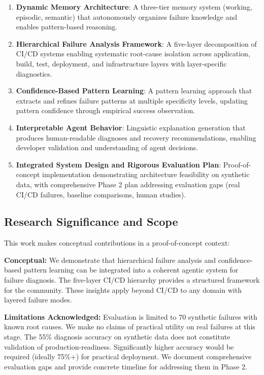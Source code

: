 \documentclass[11pt]{article}
\begin{document}
\begin{enumerate}
    \item \textbf{Dynamic Memory Architecture}: A three-tier memory system (working, episodic, semantic) that autonomously organizes failure knowledge and enables pattern-based reasoning.

    \item \textbf{Hierarchical Failure Analysis Framework}: A five-layer decomposition of CI/CD systems enabling systematic root-cause isolation across application, build, test, deployment, and infrastructure layers with layer-specific diagnostics.

    \item \textbf{Confidence-Based Pattern Learning}: A pattern learning approach that extracts and refines failure patterns at multiple specificity levels, updating pattern confidence through empirical success observation.

    \item \textbf{Interpretable Agent Behavior}: Linguistic explanation generation that produces human-readable diagnoses and recovery recommendations, enabling developer validation and understanding of agent decisions.

    \item \textbf{Integrated System Design and Rigorous Evaluation Plan}: Proof-of-concept implementation demonstrating architecture feasibility on synthetic data, with comprehensive Phase 2 plan addressing evaluation gaps (real CI/CD failures, baseline comparisons, human studies).
\end{enumerate}

\subsection{Research Significance and Scope}

This work makes conceptual contributions in a proof-of-concept context:

\textbf{Conceptual:} We demonstrate that hierarchical failure analysis and confidence-based pattern learning can be integrated into a coherent agentic system for failure diagnosis. The five-layer CI/CD hierarchy provides a structured framework for the community. These insights apply beyond CI/CD to any domain with layered failure modes.

\textbf{Limitations Acknowledged:} Evaluation is limited to 70 synthetic failures with known root causes. We make no claims of practical utility on real failures at this stage. The 55\% diagnosis accuracy on synthetic data does not constitute validation of production-readiness. Significantly higher accuracy would be required (ideally 75\%+) for practical deployment. We document comprehensive evaluation gaps and provide concrete timeline for addressing them in Phase 2.
\end{document}

